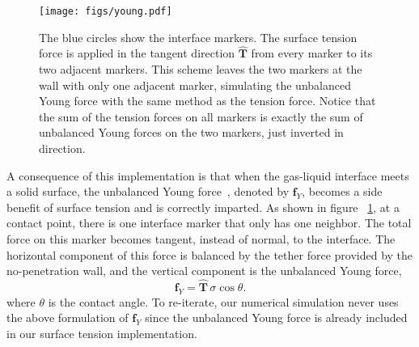 \documentclass{jfm}
\begin{document}
\begin{figure}
    \centering
    \texttt{[image: figs/young.pdf]}
    \caption{\label{fig:young}
        The blue circles show the interface markers. The surface tension force is applied in the tangent direction $\bm{\hat{T}}$ from every marker to its two adjacent markers. This scheme leaves the two markers at the wall with only one adjacent marker, simulating the unbalanced Young force with the same method as the tension force. Notice that the sum of the tension forces on all markers is exactly the sum of unbalanced Young forces on the two markers, just inverted in direction. 
    }
\end{figure}
A consequence of this implementation is that when the gas-liquid interface meets a solid surface, the unbalanced Young force~\citep{quian2003generalized}, denoted by $\bm{f}_Y$, becomes a side benefit of surface tension and is correctly imparted. As shown in figure ~\ref{fig:young}, at a contact point, there is one interface marker that only has one neighbor. The total force on this marker becomes tangent, instead of normal, to the interface. The horizontal component of this force is balanced by the tether force provided by the no-penetration wall, and the vertical component is the unbalanced Young force, 
\begin{equation}
    \bm{f}_Y = \bm{\hat{T}} \, \sigma \cos\theta. \label{eq:young}
\end{equation}
where $\theta$ is the contact angle. To re-iterate, our numerical simulation never uses the above formulation of $\bm{f}_Y$ since the unbalanced Young force is already included in our surface tension implementation. 
\end{document}
